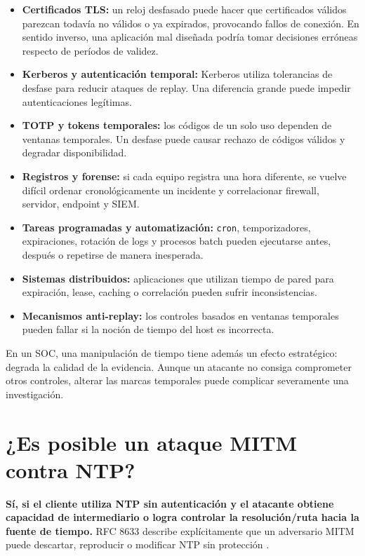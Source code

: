 \documentclass[11pt,a4paper]{article}
\begin{document}
\begin{itemize}
    \item \textbf{Certificados TLS:} un reloj desfasado puede hacer que certificados válidos parezcan todavía no válidos o ya expirados, provocando fallos de conexión. En sentido inverso, una aplicación mal diseñada podría tomar decisiones erróneas respecto de períodos de validez.
    \item \textbf{Kerberos y autenticación temporal:} Kerberos utiliza tolerancias de desfase para reducir ataques de replay. Una diferencia grande puede impedir autenticaciones legítimas.
    \item \textbf{TOTP y tokens temporales:} los códigos de un solo uso dependen de ventanas temporales. Un desfase puede causar rechazo de códigos válidos y degradar disponibilidad.
    \item \textbf{Registros y forense:} si cada equipo registra una hora diferente, se vuelve difícil ordenar cronológicamente un incidente y correlacionar firewall, servidor, endpoint y SIEM.
    \item \textbf{Tareas programadas y automatización:} \texttt{cron}, temporizadores, expiraciones, rotación de logs y procesos batch pueden ejecutarse antes, después o repetirse de manera inesperada.
    \item \textbf{Sistemas distribuidos:} aplicaciones que utilizan tiempo de pared para expiración, lease, caching o correlación pueden sufrir inconsistencias.
    \item \textbf{Mecanismos anti-replay:} los controles basados en ventanas temporales pueden fallar si la noción de tiempo del host es incorrecta.
\end{itemize}

En un SOC, una manipulación de tiempo tiene además un efecto estratégico: degrada la calidad de la evidencia. Aunque un atacante no consiga comprometer otros controles, alterar las marcas temporales puede complicar severamente una investigación.

\section{¿Es posible un ataque MITM contra NTP?}

\textbf{Sí, si el cliente utiliza NTP sin autenticación y el atacante obtiene capacidad de intermediario o logra controlar la resolución/ruta hacia la fuente de tiempo.} RFC 8633 describe explícitamente que un adversario MITM puede descartar, reproducir o modificar NTP sin protección \cite{rfc8633}.
\end{document}
